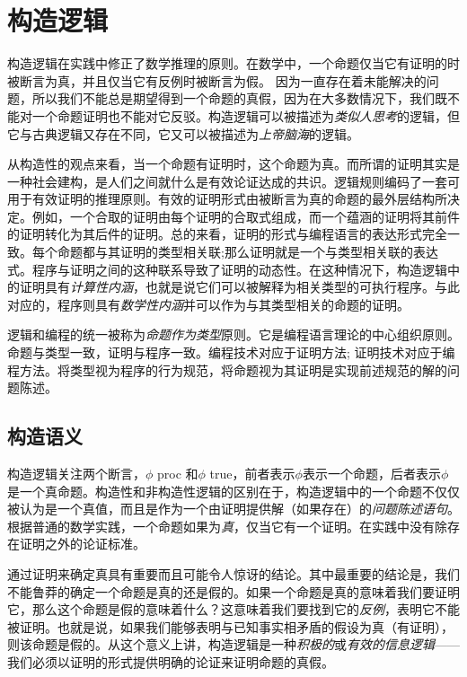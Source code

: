 


%

%

\chapter{构造逻辑}
构造逻辑在实践中修正了数学推理的原则。在数学中，一个命题仅当它有证明的时被断言为真，并且仅当它有反例时被断言为假。 因为一直存在着未能解决的问题，所以我们不能总是期望得到一个命题的真假，因为在大多数情况下，我们既不能对一个命题证明也不能对它反驳。构造逻辑可以被描述为\textit{类似人思考}的逻辑，但它与古典逻辑又存在不同，它又可以被描述为\textit{上帝脑海}的逻辑。


从构造性的观点来看，当一个命题有证明时，这个命题为真。而所谓的证明其实是一种社会建构，是人们之间就什么是有效论证达成的共识。逻辑规则编码了一套可用于有效证明的推理原则。有效的证明形式由被断言为真的命题的最外层结构所决定。例如，一个合取的证明由每个证明的合取式组成，而一个蕴涵的证明将其前件的证明转化为其后件的证明。总的来看，证明的形式与编程语言的表达形式完全一致。每个命题都与其证明的类型相关联;那么证明就是一个与类型相关联的表达式。程序与证明之间的这种联系导致了证明的动态性。在这种情况下，构造逻辑中的证明具有\textit{计算性内涵}，也就是说它们可以被解释为相关类型的可执行程序。与此对应的，程序则具有\textit{数学性内涵}并可以作为与其类型相关的命题的证明。


逻辑和编程的统一被称为\textit{命题作为类型}原则。它是编程语言理论的中心组织原则。命题与类型一致，证明与程序一致。编程技术对应于证明方法; 证明技术对应于编程方法。将类型视为程序的行为规范，将命题视为其证明是实现前述规范的解的问题陈述。
\section{构造语义}
构造逻辑关注两个断言，${\phi}$ proc 和${\phi}$ true，前者表示${\phi}$表示一个命题，后者表示${\phi}$是一个真命题。构造性和非构造性逻辑的区别在于，构造逻辑中的一个命题不仅仅被认为是一个真值，而且是作为一个由证明提供解（如果存在）的\textit{问题陈述语句}。根据普通的数学实践，一个命题如果为\textit{真}，仅当它有一个证明。在实践中没有除存在证明之外的论证标准。


通过证明来确定真具有重要而且可能令人惊讶的结论。其中最重要的结论是，我们不能鲁莽的确定一个命题是真的还是假的。如果一个命题是真的意味着我们要证明它，那么这个命题是假的意味着什么？这意味着我们要找到它的\textit{反例}，表明它不能被证明。也就是说，如果我们能够表明与已知事实相矛盾的假设为真（有证明），则该命题是假的。从这个意义上讲，构造逻辑是一种\textit{积极的}或\textit{有效的信息逻辑}——我们必须以证明的形式提供明确的论证来证明命题的真假。


